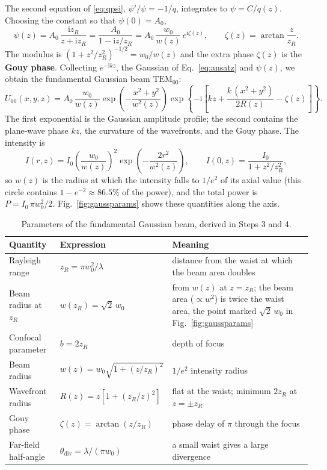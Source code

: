 \documentclass[11pt,a4paper]{article}
\begin{document}
	The second equation of \eqref{eq:qpsi}, $\psi'/\psi=-1/q$, integrates to $\psi=C/q(z)$. Choosing the constant so that $\psi(0)=A_0$,
	\begin{equation}
		\psi(z)=A_0\,\frac{\mathrm{i}z_R}{z+\mathrm{i}z_R}=\frac{A_0}{1-\mathrm{i}z/z_R}=A_0\,\frac{w_0}{w(z)}\,e^{\mathrm{i}\zeta(z)},
		\qquad \zeta(z)=\arctan\frac{z}{z_R}.
		\label{eq:gaussR}
	\end{equation}
	The modulus is $\left(1+z^2/z_R^2\right)^{-1/2}=w_0/w(z)$ and the extra phase $\zeta(z)$ is the \textbf{Gouy phase}. Collecting $e^{-\mathrm{i}kz}$, the Gaussian of Eq.~\eqref{eq:ansatz} and $\psi(z)$, we obtain the fundamental Gaussian beam $\mathrm{TEM}_{00}$:
	\begin{equation}
		U_{00}(x,y,z)=A_0\,\frac{w_0}{w(z)}\exp\!\left(-\frac{x^2+y^2}{w^2(z)}\right)\exp\!\left\{-\mathrm{i}\left[kz+\frac{k\,(x^2+y^2)}{2R(z)}-\zeta(z)\right]\right\}.
		\label{eq:u00}
	\end{equation}
	The first exponential is the Gaussian amplitude profile; the second contains the plane-wave phase $kz$, the curvature of the wavefronts, and the Gouy phase. The intensity is
	\begin{equation}
		I(r,z)=I_0\left(\frac{w_0}{w(z)}\right)^{2}\exp\!\left(-\frac{2r^2}{w^2(z)}\right),\qquad I(0,z)=\frac{I_0}{1+z^2/z_R^2},
	\end{equation}
	so $w(z)$ is the radius at which the intensity falls to $1/e^2$ of its axial value (this circle contains $1-e^{-2}\approx86.5\%$ of the power), and the total power is $P=I_0\,\pi w_0^2/2$. Fig.~\ref{fig:gaussparams} shows these quantities along the axis.
	
	\begin{table}[ht]
		\centering
		\small
		\begin{tabular}{@{}p{3.3cm}p{4.6cm}p{6.2cm}@{}}
			\toprule
			Quantity & Expression & Meaning\\
			\midrule
			Rayleigh range & $z_R=\pi w_0^2/\lambda$ & distance from the waist at which the beam area doubles\\
			Beam radius at $z_R$ & $w(z_R)=\sqrt2\,w_0$ & from $w(z)$ at $z=z_R$; the beam area ($\propto w^2$) is twice the waist area, the point marked $\sqrt2\,w_0$ in Fig.~\ref{fig:gaussparams}\\
			Confocal parameter & $b=2z_R$ & depth of focus\\
			Beam radius & $w(z)=w_0\sqrt{1+(z/z_R)^2}$ & $1/e^2$ intensity radius\\
			Wavefront radius & $R(z)=z\left[1+(z_R/z)^2\right]$ & flat at the waist; minimum $2z_R$ at $z=\pm z_R$\\
			Gouy phase & $\zeta(z)=\arctan(z/z_R)$ & phase delay of $\pi$ through the focus\\
			Far-field half-angle & $\theta_{\mathrm{div}}=\lambda/(\pi w_0)$ & a small waist gives a large divergence\\
			\bottomrule
		\end{tabular}
		\caption{Parameters of the fundamental Gaussian beam, derived in Steps 3 and 4.}
		\label{tab:gauss}
	\end{table}
	
\end{document}
